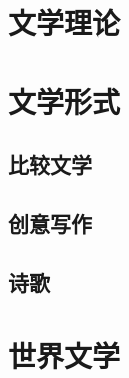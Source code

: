 \section{文学理论}

\section{文学形式}
\subsection{比较文学}
\subsection{创意写作}
\subsection{诗歌}

\section{世界文学}




